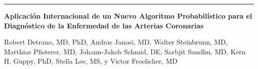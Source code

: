 \documentclass[12pt,letterpaper]{article}
\begin{document}
\noindent\rule{\textwidth}{0.8pt}
\vspace{0.5cm}

\begin{center}
    {\selectfont\huge\bfseries 
    Aplicación Internacional de un Nuevo Algoritmo 
    Probabilístico para el Diagnóstico de la Enfermedad 
    de las Arterias Coronarias
    }
    \vspace{0.6cm}
    
    {\selectfont\large 
    Robert Detrano, MD, PhD, Andras Janosi, MD, Walter Steinbrunn, MD, Matthias Pfisterer, MD,
    Johann-Jakob Schmid, DE, Sarbjit Sandhu, MD, Kern H. Guppy, PhD, Stella Lee, MS,
    y Victor Froelicher, MD}
\end{center}

\vspace{0cm}
\end{document}
